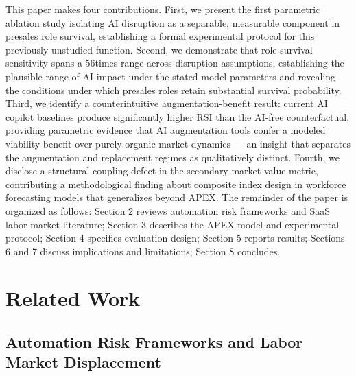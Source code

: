 \documentclass[10pt, conference]{IEEEtran}
\begin{document}
This paper makes four contributions. First, we present the first parametric ablation study isolating AI disruption as a separable, measurable component in presales role survival, establishing a formal experimental protocol for this previously unstudied function. Second, we demonstrate that role survival sensitivity spans a 56times range across disruption assumptions, establishing the plausible range of AI impact under the stated model parameters and revealing the conditions under which presales roles retain substantial survival probability. Third, we identify a counterintuitive augmentation-benefit result: current AI copilot baselines produce significantly higher RSI than the AI-free counterfactual, providing parametric evidence that AI augmentation tools confer a modeled viability benefit over purely organic market dynamics --- an insight that separates the augmentation and replacement regimes as qualitatively distinct. Fourth, we disclose a structural coupling defect in the secondary market value metric, contributing a methodological finding about composite index design in workforce forecasting models that generalizes beyond APEX. The remainder of the paper is organized as follows: Section 2 reviews automation risk frameworks and SaaS labor market literature; Section 3 describes the APEX model and experimental protocol; Section 4 specifies evaluation design; Section 5 reports results; Sections 6 and 7 discuss implications and limitations; Section 8 concludes.

\section{Related Work}

\label{sec:related_work}

\subsection{Automation Risk Frameworks and Labor Market Displacement}

\label{sec:automation_risk_frameworks_and_labor_mar}
\end{document}
